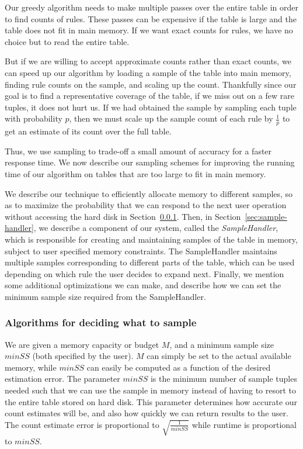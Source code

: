 \documentclass[10pt,journal,compsoc]{IEEEtran}
\newcounter{prob}
\newcommand{\techreporttext}[1]{#1}
\begin{document}
\techreporttext{
Our greedy algorithm needs to make multiple passes over the entire table in order to find counts of rules. These passes can be expensive if the table is large and the table does not fit in main memory. If we want exact counts for rules, we have no choice but to read the entire table. 

But if we are willing to accept approximate counts rather than exact counts, we can speed up our algorithm by loading a sample of the table into main memory, finding rule counts on the sample, and scaling up the count. Thankfully since our goal is to find a representative coverage of the table, if we miss out on a few rare tuples, it does not hurt us. If we had obtained the sample by sampling each tuple with probability $p$, then we must scale up the sample count of each rule by $\frac{1}{p}$ to get an estimate of its count over the full table. 

Thus, we use sampling to trade-off a small amount of accuracy for a faster response time. We now describe our sampling schemes for improving the running time of our algorithm on tables that are too large to fit in main memory. 

We describe our technique to efficiently allocate memory to different samples, so as to maximize the probability that we can respond to the next user operation without accessing the hard disk in Section~\ref{sec:sampling_algorithms}. 
Then, in Section~\ref{sec:sample-handler}, we describe a component of our system, called the {\em SampleHandler}, which is responsible for creating and maintaining samples of the table in memory, subject to user specified memory constraints. The SampleHandler maintains multiple samples corresponding to different parts of the table, which can be used depending on which rule the user decides to expand next. Finally, we mention some additional optimizations we can make, and
describe how we can set the minimum sample size required from the SampleHandler.

\subsubsection{Algorithms for deciding what to sample}\label{sec:sampling_algorithms}

We are given a memory capacity or budget $M$, and a minimum sample size $minSS$ (both specified by the user). $M$ can simply be set to the actual available memory, while $minSS$ can easily be computed as a function of the desired estimation error.
The parameter $minSS$ is the minimum number of sample tuples needed
such that we can use the sample in memory 
instead of having to resort to the entire table stored
on hard disk. 
This parameter determines how accurate our count estimates will be, and also
how quickly we can return results to the user. The count estimate error is proportional to $\sqrt{\frac{1}{minSS}}$ while runtime is proportional to $minSS$.

}
\end{document}
